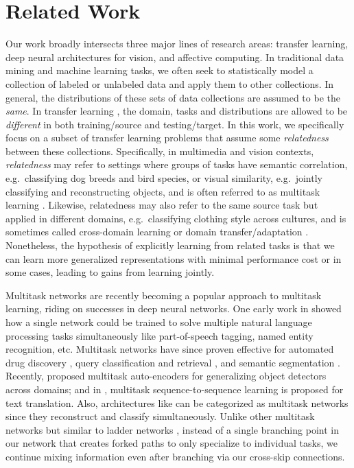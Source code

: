 \documentclass{sig-alternate-05-2015}
\begin{document}
\section{Related Work}
\label{sec:relatedwork}

Our work broadly intersects three major lines of research areas: transfer learning, deep neural architectures for vision, and affective computing.
In traditional data mining and machine learning tasks, we often seek to statistically model a collection of labeled or unlabeled data and apply them to other collections.
In general, the distributions of these sets of data collections are assumed to be the \emph{same}.
In transfer learning \cite{pan_2010}, the domain, tasks and distributions are allowed to be \emph{different} in both training/source and testing/target.
In this work, we specifically focus on a subset of transfer learning problems that assume some \emph{relatedness} between these collections.
Specifically, in multimedia and vision contexts, \emph{relatedness} may refer to settings where groups of tasks have semantic correlation, e.g.~classifying dog breeds and bird species, or visual similarity, e.g.~jointly classifying and reconstructing objects, and is often referred to as multitask learning \cite{caruana_1997}.
Likewise, relatedness may also refer to the same source task but applied in different domains, e.g.~classifying clothing style across cultures, and is sometimes called cross-domain learning \cite{jiang_2008} or domain transfer/adaptation \cite{glorot_2011,jiang_2009}.
Nonetheless, the hypothesis of explicitly learning from related tasks is that we can learn more generalized representations with minimal performance cost or in some cases, leading to gains from learning jointly.

Multitask networks are recently becoming a popular approach to multitask learning, riding on successes in deep neural networks.
One early work in \cite{collobert_2008} showed how a single network could be trained to solve multiple natural language processing tasks simultaneously like part-of-speech tagging, named entity recognition, etc.
Multitask networks have since proven effective for automated drug discovery \cite{dahl_2014,ramsundar_2015}, query classification and retrieval \cite{liu_2015}, and semantic segmentation \cite{dai_2016}.
Recently, \cite{ghifary_2015} proposed multitask auto-encoders for generalizing object detectors across domains; and in \cite{luong_2016}, multitask sequence-to-sequence learning is proposed for text translation.
Also, architectures like \cite{ramus_2015,yim_2015} can be categorized as multitask networks since they reconstruct and classify simultaneously.
Unlike other multitask networks but similar to ladder networks \cite{ramus_2015}, instead of a single branching point in our network that creates forked paths to only specialize to individual tasks, we continue mixing information even after branching via our cross-skip connections.
\end{document}
